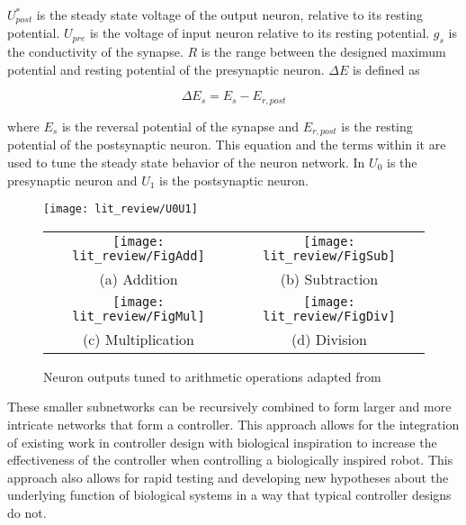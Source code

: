 $U_{post}^{*}$ is the steady state voltage of the output neuron, relative to its resting potential. $U_{pre}$ is the voltage of input neuron relative to its resting potential. $g_{s}$ is the conductivity of the synapse.
$R$ is the range between the designed maximum potential and resting potential of the presynaptic neuron. $\Delta E$ is defined as 

\begin{equation}
\Delta E_{s} = E_{s} - E_{r, post}
\end{equation}

where $E_{s}$ is the reversal potential of the synapse and $E_{r, post}$ is the resting potential of the postsynaptic neuron.
This equation and the terms within it are used to tune the steady state behavior of the neuron network. In 
$U_{0}$ is the presynaptic neuron and $U_{1}$ is the postsynaptic neuron.

\begin{figure}
\centering

\texttt{[image: lit\_review/U0U1]}

\begin{tabular}{cc}
\texttt{[image: lit\_review/FigAdd]} &
\texttt{[image: lit\_review/FigSub]} \\
(a) Addition & (b) Subtraction \\
\texttt{[image: lit\_review/FigMul]} &
\texttt{[image: lit\_review/FigDiv]} \\
(c) Multiplication & (d) Division \\
\end{tabular}
\caption{Neuron outputs tuned to arithmetic operations adapted from \cite{NickFunctionalSubnetwork}}
\label{fig:MathOutputs}
\end{figure}

These smaller subnetworks can be recursively combined to form larger and more intricate
networks that form a controller. This approach allows for the integration of
existing work in controller design with biological inspiration to increase the
effectiveness of the controller when controlling a biologically inspired robot.
This approach also allows for rapid testing and developing new hypotheses about the underlying function of biological systems in a way that typical controller designs do not.
